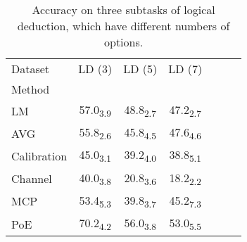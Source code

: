 \begin{table}[h]
\centering
\caption{Accuracy on three subtasks of logical deduction, which have different numbers of options.}
\label{tab:num_option}
\begin{tabular}{lcccccc}
Dataset & LD (3) & LD (5) & LD (7) \\
Method &  &  &  \\
LM & 57.0\textsubscript{3.9} & 48.8\textsubscript{2.7} & 47.2\textsubscript{2.7} \\
AVG & 55.8\textsubscript{2.6} & 45.8\textsubscript{4.5} & 47.6\textsubscript{4.6} \\
Calibration & 45.0\textsubscript{3.1} & 39.2\textsubscript{4.0} & 38.8\textsubscript{5.1} \\
Channel & 40.0\textsubscript{3.8} & 20.8\textsubscript{3.6} & 18.2\textsubscript{2.2} \\
MCP & 53.4\textsubscript{5.3} & 39.8\textsubscript{3.7} & 45.2\textsubscript{7.3} \\
PoE & 70.2\textsubscript{4.2} & 56.0\textsubscript{3.8} & 53.0\textsubscript{5.5} \\
\end{tabular}
\end{table}

